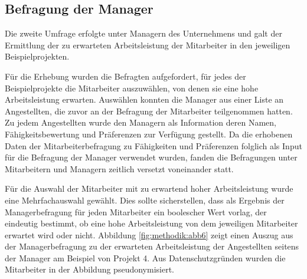 
\subsection{Befragung der Manager}
\label{ch:methodik:datenerhebung:2}
Die zweite Umfrage erfolgte unter Managern des Unternehmens und galt der Ermittlung der zu erwarteten Arbeitsleistung der Mitarbeiter in den jeweiligen Beispielprojekten.

Für die Erhebung wurden die Befragten aufgefordert, für jedes der Beispielprojekte die Mitarbeiter auszuwählen, von denen sie eine hohe Arbeitsleistung erwarten.
Auswählen konnten die Manager aus einer Liste an Angestellten, die zuvor an der Befragung der Mitarbeiter teilgenommen hatten.
Zu jedem Angestellten wurde den Managern als Information deren Namen, Fähigkeitsbewertung und Präferenzen zur Verfügung gestellt.
Da die erhobenen Daten der Mitarbeiterbefragung zu Fähigkeiten und Präferenzen folglich als Input für die Befragung der Manager verwendet wurden, fanden die Befragungen unter Mitarbeitern und Managern zeitlich versetzt voneinander statt.

Für die Auswahl der Mitarbeiter mit zu erwartend hoher Arbeitsleistung wurde eine Mehrfachauswahl gewählt.
Dies sollte sicherstellen, dass als Ergebnis der Managerbefragung für jeden Mitarbeiter ein boolescher Wert vorlag, der eindeutig bestimmt, ob eine hohe Arbeitsleistung von dem jeweiligen Mitarbeiter erwartet wird oder nicht.
Abbildung \ref{fig:methodik:abb6} zeigt einen Auszug aus der Managerbefragung zu der erwarteten Arbeitsleistung der Angestellten seitens der Manager am Beispiel von Projekt 4.
Aus Datenschutzgründen wurden die Mitarbeiter in der Abbildung pseudonymisiert.

